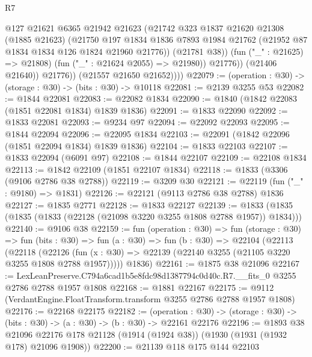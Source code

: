 \begin{lexlean}{R7}
\begin{coremodule}
                      @127
                      @21621
                      @6365
                      @21942
                      @21623
                      (@21742
                        @323
                        @1837
                        @21620
                        @21308
                        (@1885 @21623)
                        (@21750
                          @197
                          @1834
                          @1836
                          @7893
                          @1984
                          @21762
                          (@21952 @87 @1834 @1834 @126 @1824 @21960 @21776))
                        (@21781 @38))
                      (fun ("_" : @21625) => @21808)
                      (fun ("_" : @21624 @2055) => @21980))
                    @21776))
                (@21406 @21640))
              @21776))
          (@21557 @21650 @21652))))
@22079 := (operation : @30) -> (storage : @30) -> (bits : @30) -> @10118
@22081 := @2139 @3255 @53
@22082 := @1844 @22081
@22083 := @22082 @1834
@22090 := @1840 (@1842 @22083 (@1851 @22081 @1834) @1839 @1836)
@22091 := @1833 @22090
@22092 := @1833 @22081
@22093 := @9234 @97
@22094 := @22092 @22093
@22095 := @1844 @22094
@22096 := @22095 @1834
@22103 := @22091 (@1842 @22096 (@1851 @22094 @1834) @1839 @1836)
@22104 := @1833 @22103
@22107 := @1833 @22094 (@6091 @97)
@22108 := @1844 @22107
@22109 := @22108 @1834
@22113 := @1842 @22109 (@1851 @22107 @1834)
@22118 := @1833 (@3306 (@9106 @2786 @38 @2788))
@22119 := @3209 @30
@22121 := @22119 (fun ("_" : @9180) => @1831)
@22126 := @22121 (@9113 @2786 @38 @2788) @1836
@22127 := @1835 @2771
@22128 := @1833 @22127
@22139 := @1833 (@1835 (@1835 (@1833 (@22128 (@21098 @3220 @3255 @1808 @2788 @1957)) @1834)))
@22140 := @9106 @38
@22159 := fun (operation : @30) =>
  fun (storage : @30) =>
  fun (bits : @30) =>
  fun (a : @30) =>
  fun (b : @30) =>
  @22104
    (@22113
      (@22118
        (@22126 (fun (x : @30) => @22139 (@22140 @3255 (@21105 @3220 @3255 @1808 @2788 @1957)))))
      @1836)
@22161 := @1875 @38 @21096
@22167 := LexLeanPreserve.C794a6cad1b5e8fdc98d1387794c0d40c.R7.__fits_0
    @3255
    @2786
    @2788
    @1957
    @1808
@22168 := @1881 @22167
@22175 := @9112 (VerdantEngine.FloatTransform.transform @3255 @2786 @2788 @1957 @1808)
@22176 := @22168 @22175
@22182 := (operation : @30) ->
  (storage : @30) -> (bits : @30) -> (a : @30) -> (b : @30) -> @22161 @22176
@22196 := @1893
    @38
    @21096
    @22176
    @178
    @21128
    (@1914 (@1924 @38))
    (@1930 (@1931 (@1932 @178) @21096 @1908))
@22200 := @21139 @118 @175 @144 @22103

\end{coremodule}
\end{lexlean}
